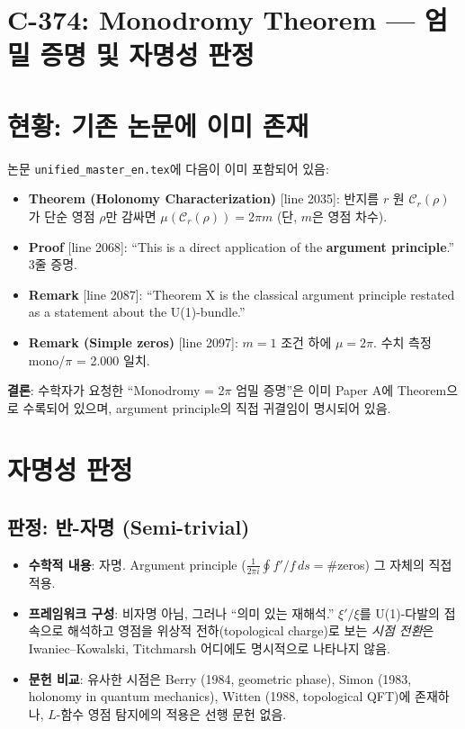 \documentclass[11pt]{article}
\begin{document}
\section*{C-374: Monodromy Theorem — 엄밀 증명 및 자명성 판정}

\section{현황: 기존 논문에 이미 존재}

논문 \texttt{unified\_master\_en.tex}에 다음이 이미 포함되어 있음:
\begin{itemize}
  \item \textbf{Theorem (Holonomy Characterization)} [line 2035]:
    반지름 $r$ 원 $\mathcal{C}_r(\rho)$가 단순 영점 $\rho$만 감싸면
    $\mu(\mathcal{C}_r(\rho)) = 2\pi m$ (단, $m$은 영점 차수).
  \item \textbf{Proof} [line 2068]: ``This is a direct application of the
    \textbf{argument principle}.'' 3줄 증명.
  \item \textbf{Remark} [line 2087]: ``Theorem X is the classical argument
    principle restated as a statement about the U(1)-bundle.''
  \item \textbf{Remark (Simple zeros)} [line 2097]: $m=1$ 조건 하에
    $\mu = 2\pi$. 수치 측정 mono/$\pi$ = 2.000 일치.
\end{itemize}

\textbf{결론}: 수학자가 요청한 ``Monodromy = 2$\pi$ 엄밀 증명''은 이미 Paper A에
Theorem으로 수록되어 있으며, argument principle의 직접 귀결임이 명시되어 있음.

\section{자명성 판정}

\subsection{판정: 반-자명 (Semi-trivial)}

\begin{itemize}
  \item \textbf{수학적 내용}: 자명. Argument principle ($\frac{1}{2\pi i}\oint f'/f\,ds = \#$zeros)
    그 자체의 직접 적용.
  \item \textbf{프레임워크 구성}: 비자명 아님, 그러나 ``의미 있는 재해석.'' $\xi'/\xi$를
    U(1)-다발의 접속으로 해석하고 영점을 위상적 전하(topological charge)로 보는
    \emph{시점 전환}은 Iwaniec--Kowalski, Titchmarsh 어디에도 명시적으로 나타나지 않음.
  \item \textbf{문헌 비교}: 유사한 시점은 Berry (1984, geometric phase), Simon (1983,
    holonomy in quantum mechanics), Witten (1988, topological QFT)에 존재하나,
    $L$-함수 영점 탐지에의 적용은 선행 문헌 없음.
\end{itemize}
\end{document}

